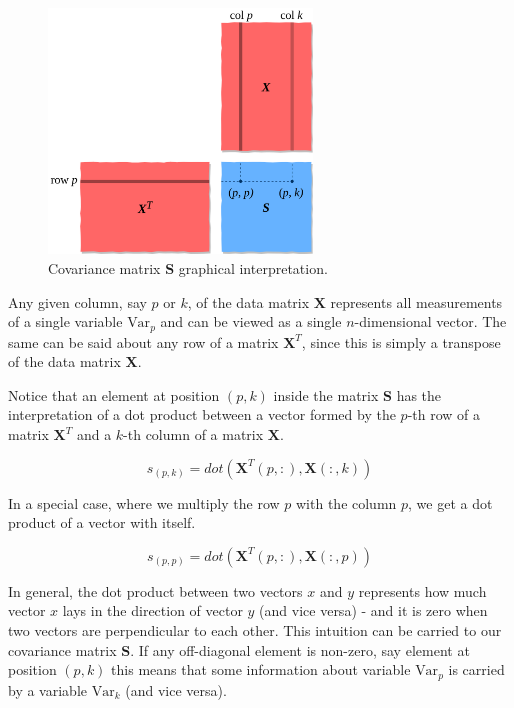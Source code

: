 \documentclass[10pt,twocolumn]{article}
\begin{document}
\begin{figure}[H]
\centering\includegraphics[width=7cm]{cov-matrix.png}
\caption{Covariance matrix $\bm{S}$ graphical interpretation.}
\label{fig:covariance-matrix}
\end{figure}

Any given column, say $p$ or $k$, of the data matrix $\bm{X}$ represents all measurements of a single variable $\text{Var}_p$ and can be viewed as a single $n$-dimensional vector. The same can be said about any row of a matrix $\bm{X}^T$, since this is simply a transpose of the data matrix $\bm{X}$.

Notice that an element at position $(p,k)$ inside the matrix $\bm{S}$ has the interpretation of a dot product between a vector formed by the $p$-th row of a matrix $\bm{X}^T$ and a $k$-th column of a matrix $\bm{X}$. 

\begin{equation}
s_{(p,k)} = dot( \bm{X}^T(p, :), \bm{X}(:,k))
\end{equation}

In a special case, where we multiply the row $p$ with the column $p$, we get a dot product of a vector with itself.

\begin{equation}
s_{(p,p)} = dot( \bm{X}^T(p, :), \bm{X}(:,p))
\end{equation}

In general, the dot product between two vectors $x$ and $y$ represents how much vector $x$ lays in the direction of vector $y$ (and vice versa) - and it is zero when two vectors are perpendicular to each other. This intuition can be carried to our covariance matrix $\bm{S}$. If any off-diagonal element is non-zero, say element at position $(p,k)$ this means that some information about variable $\text{Var}_p$ is carried by a variable $\text{Var}_k$ (and vice versa).
\end{document}
